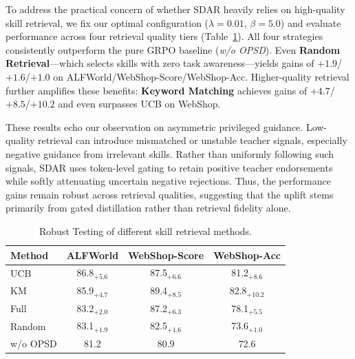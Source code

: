 \documentclass{llmxive}
\providecommand{\methodname}{\textsc{SDAR}\xspace}
\providecommand{\posval}[1]{{#1}}
\begin{document}
To address the practical concern of whether \methodname{} heavily relies on high-quality skill retrieval, we fix our optimal configuration ($\lambda=0.01$, $\beta=5.0$) and evaluate performance across four retrieval quality tiers (Table~\ref{tab:ablation_method}). 
All four strategies consistently outperform the pure GRPO baseline (\emph{w/o OPSD}). 
Even \textbf{Random Retrieval}---which selects skills with zero task awareness---yields gains of $+1.9$/$+1.6$/$+1.0$ on ALFWorld/WebShop-Score/WebShop-Acc. 
Higher-quality retrieval further amplifies these benefits: \textbf{Keyword Matching} achieves gains of $+4.7$/$+8.5$/$+10.2$ and even surpasses UCB on WebShop. 

These results echo our observation on asymmetric privileged guidance. 
Low-quality retrieval can introduce mismatched or unstable teacher signals, especially negative guidance from irrelevant skills. 
Rather than uniformly following such signals, \methodname{} uses token-level gating to retain positive teacher endorsements while softly attenuating uncertain negative rejections. 
Thus, the performance gains remain robust across retrieval qualities, suggesting that the uplift stems primarily from gated distillation rather than retrieval fidelity alone.

\begin{table}[t]       
    \centering
                                                             
    \begin{tabular}{lccc}
    \toprule
        Method & ALFWorld & WebShop-Score & WebShop-Acc \\

        \midrule

        UCB & 86.8\posval{$_{+5.6}$} & 87.5\posval{$_{+6.6}$} & 81.2\posval{$_{+8.6}$} \\   
        KM & 85.9\posval{$_{+4.7}$} & 89.4\posval{$_{+8.5}$} & 82.8\posval{$_{+10.2}$} \\
        Full & 83.2\posval{$_{+2.0}$} & 87.2\posval{$_{+6.3}$} & 78.1\posval{$_{+5.5}$} \\  
        Random & 83.1\posval{$_{+1.9}$} & 82.5\posval{$_{+1.6}$} & 73.6\posval{$_{+1.0}$} \\
        \rowcolor{gray!10} w/o OPSD & 81.2 & 80.9 & 72.6 \\
        \bottomrule
    \end{tabular}
\caption{Robust Testing of different skill retrieval methods.}
\label{tab:ablation_method}
\end{table} 
\end{document}
